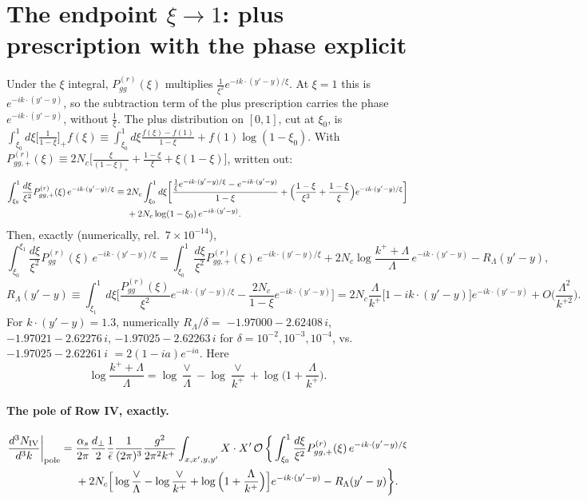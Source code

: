 \documentclass[10pt]{article}
\numberwithin{equation}{section}
\newcommand{\OO}{\mathcal O}
\newcommand{\pre}{\frac{1}{(2\pi)^3}\frac{g^2}{2\pi^2k^+}}
\begin{document}
\section{The endpoint \texorpdfstring{$\xi\to1$}{xi to 1}: plus prescription with the phase explicit}\label{sec:plus}
Under the $\xi$ integral, $P^{(r)}_{gg}(\xi)$ multiplies $\frac{1}{\xi^2}e^{-ik\cdot(y'-y)/\xi}$. At $\xi=1$ this is $e^{-ik\cdot(y'-y)}$, so the subtraction term of the plus prescription carries the phase $e^{-ik\cdot(y'-y)}$, without $\frac1\xi$. The plus distribution on $[0,1]$, cut at $\xi_0$, is $\int_{\xi_0}^1d\xi\big[\frac{1}{1-\xi}\big]_+f(\xi)\equiv\int_{\xi_0}^1d\xi\frac{f(\xi)-f(1)}{1-\xi}+f(1)\log(1-\xi_0)$. With $P^{(r)}_{gg,+}(\xi)\equiv2N_c\big[\frac{\xi}{(1-\xi)_+}+\frac{1-\xi}{\xi}+\xi(1-\xi)\big]$, written out:
\begin{align}
\int_{\xi_0}^1\frac{d\xi}{\xi^2}P^{(r)}_{gg,+}(\xi)\,e^{-ik\cdot(y'-y)/\xi}\equiv{}&2N_c\int_{\xi_0}^1d\xi\bigg[\frac{\frac{1}{\xi}e^{-ik\cdot(y'-y)/\xi}-e^{-ik\cdot(y'-y)}}{1-\xi}+\Big(\frac{1-\xi}{\xi^3}+\frac{1-\xi}{\xi}\Big)e^{-ik\cdot(y'-y)/\xi}\bigg]\notag\\
&+2N_c\log(1-\xi_0)\,e^{-ik\cdot(y'-y)}.
\label{eq:plusdef}
\end{align}
Then, exactly (numerically, rel.\ $7\times10^{-14}$),
\begin{equation}
\int_{\xi_0}^{\xi_1}\frac{d\xi}{\xi^2}P^{(r)}_{gg}(\xi)\,e^{-ik\cdot(y'-y)/\xi}=\int_{\xi_0}^1\frac{d\xi}{\xi^2}P^{(r)}_{gg,+}(\xi)\,e^{-ik\cdot(y'-y)/\xi}+2N_c\log\frac{k^++\Lambda}{\Lambda}\,e^{-ik\cdot(y'-y)}-R_\Lambda(y'-y),
\label{eq:plusid}
\end{equation}
\begin{equation}
R_\Lambda(y'-y)\equiv\int_{\xi_1}^1d\xi\Big[\frac{P^{(r)}_{gg}(\xi)}{\xi^2}e^{-ik\cdot(y'-y)/\xi}-\frac{2N_c}{1-\xi}e^{-ik\cdot(y'-y)}\Big]=2N_c\frac{\Lambda}{k^+}\big[1-ik\cdot(y'-y)\big]e^{-ik\cdot(y'-y)}+O\Big(\frac{\Lambda^2}{k^{+2}}\Big).
\label{eq:RL}
\end{equation}
For $k\cdot(y'-y)=1.3$, numerically $R_\Lambda/\delta=$ $-1.97000-2.62408\,i$, $-1.97021-2.62276\,i$, $-1.97025-2.62263\,i$ for $\delta=10^{-2},10^{-3},10^{-4}$, vs.\ $-1.97025-2.62261\,i$ $=2(1-ia)e^{-ia}$. Here
\begin{equation}
\log\frac{k^++\Lambda}{\Lambda}=\log\frac{\vee}{\Lambda}-\log\frac{\vee}{k^+}+\log\Big(1+\frac{\Lambda}{k^+}\Big).
\end{equation}

\paragraph{The pole of Row IV, exactly.}
\begin{align}
\frac{d^3N_{\rm IV}}{d^3k}\bigg|_{\rm pole}={}&\frac{\alpha_s}{2\pi}\frac{d_\perp}{2}\frac{1}{\bar\epsilon}\pre\int_{x,x',y,y'}X\cdot X'\,\OO\,\bigg\{\int_{\xi_0}^1\frac{d\xi}{\xi^2}P^{(r)}_{gg,+}(\xi)\,e^{-ik\cdot(y'-y)/\xi}\notag\\
&+2N_c\Big[\log\frac{\vee}{\Lambda}-\log\frac{\vee}{k^+}+\log\Big(1+\frac{\Lambda}{k^+}\Big)\Big]e^{-ik\cdot(y'-y)}-R_\Lambda(y'-y)\bigg\}.
\label{eq:poleplus}
\end{align}
\end{document}
